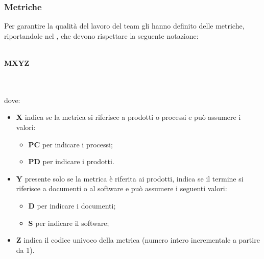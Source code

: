 \subsubsection{Metriche}
 Per garantire la qualità del lavoro del team gli \AMMP{} hanno definito delle metriche, riportandole
nel \PQdoc, che devono rispettare la seguente notazione:\\ \\
\centerline{\textbf{M\textbraceleft{}X\textbraceright{}\textbraceleft{}Y\textbraceright{}\textbraceleft{}Z\textbraceright{}}} \\ \\
dove:  
\begin{itemize}
	\item \textbf{X} indica se la metrica si riferisce a prodotti o processi e può assumere
i valori:
	\begin{itemize}
		\item \textbf{PC} per indicare i processi;
		\item \textbf{PD} per indicare i prodotti.
	\end{itemize}
	\item \textbf{Y} presente solo se la metrica è riferita ai prodotti, indica se il termine  si riferisce a documenti o al software e può assumere i seguenti valori:
	\begin{itemize}
		\item \textbf{D} per indicare i documenti;
		\item \textbf{S} per indicare il software;
	\end{itemize}
	\item \textbf{Z} indica il codice univoco della metrica (numero intero incrementale a partire da 1).
\end{itemize}

